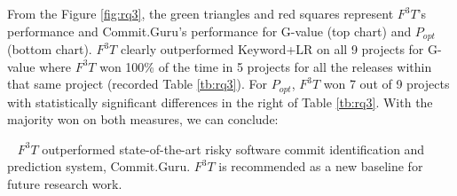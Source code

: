\documentclass[10pt,conference]{IEEEtran}
\newenvironment{RQ}[1]%
{\noindent\begin{minipage}[c]{\linewidth}%
\begin{bclogo}[couleur=gray!25,%
                arrondi=0.1,%
                logo=\bctrombone,%
                ombre=true]{~#1}}%
{\end{bclogo}\end{minipage}\vspace{2mm}}
\begin{document}
From the Figure \ref{fig:rq3}, the green triangles and red squares represent $F^3T$'s performance and Commit.Guru's performance for G-value (top chart) and $P_{opt}$ (bottom chart). $F^3T$ clearly outperformed Keyword+LR on all 9 projects for G-value where $F^3T$ won 100\% of the time in 5 projects for all the releases within that same project (recorded Table \ref{tb:rq3}). For $P_{opt}$, $F^3T$ won 7 out of 9 projects with statistically significant differences in the right of Table \ref{tb:rq3}. With the majority won on both measures, we can conclude: 


\begin{RQ}{}
\vspace{-10pt}
$F^3T$ outperformed state-of-the-art risky software commit identification and prediction system, Commit.Guru. $F^3T$ is recommended as a new baseline for future research work.
\end{RQ}




 

\end{document}

